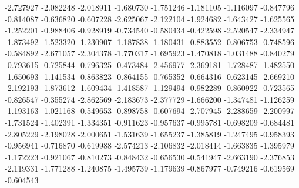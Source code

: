 -2.727927
-2.082248
-2.018911
-1.680730
-1.751246
-1.181105
-1.116097
-0.847796
-0.814087
-0.636820
-0.607228
-2.625067
-2.122104
-1.924682
-1.643427
-1.625565
-1.252201
-0.988406
-0.928919
-0.734540
-0.580434
-0.422598
-2.520547
-2.334947
-1.873492
-1.523320
-1.230907
-1.187838
-1.180431
-0.883552
-0.806753
-0.748596
-0.584892
-2.671057
-2.304378
-1.770317
-1.695923
-1.470818
-1.031488
-0.840279
-0.793615
-0.725844
-0.796325
-0.473484
-2.456977
-2.369181
-1.728487
-1.482550
-1.650693
-1.141534
-0.863823
-0.864155
-0.765352
-0.664316
-0.623145
-2.669210
-2.192193
-1.873612
-1.609434
-1.418587
-1.129494
-0.982289
-0.860922
-0.723565
-0.826547
-0.355274
-2.862569
-2.183673
-2.377729
-1.666200
-1.347481
-1.126259
-1.193163
-1.021168
-0.549653
-0.898758
-0.607694
-2.707945
-2.288659
-2.200997
-1.731524
-1.402391
-1.334351
-0.911623
-0.957637
-0.995781
-0.698209
-0.684481
-2.805229
-2.198028
-2.000651
-1.531639
-1.655237
-1.385819
-1.247495
-0.958393
-0.956941
-0.716870
-0.619988
-2.574213
-2.106832
-2.018414
-1.663835
-1.395979
-1.172223
-0.921067
-0.810273
-0.848432
-0.656530
-0.541947
-2.663190
-2.376853
-2.119331
-1.771288
-1.240875
-1.495739
-1.179639
-0.867977
-0.749216
-0.619569
-0.604543
